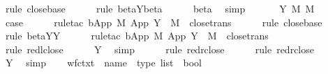 \begin{isabellebody}
\ {\isacharparenleft}rule\ close{\isachardot}base{\isacharparenright}\isanewline
\ \ \ \ \isamarkupfalse%
\ {\isacharparenleft}rule\ beta{\isacharunderscore}Y{\isachardot}beta{\isacharparenright}\isanewline
\ \ \ \ \isamarkupfalse%
\ beta\ \isamarkupfalse%
\ simp\isanewline
\ \ \isamarkupfalse%
\isanewline
\ \ \isamarkupfalse%
\ {\isacharparenleft}Y\ M\ M{\isacharprime}\ {\isasymsigma}{\isacharparenright}\ \isanewline
\ \ \ \ \isamarkupfalse%
\ {\isacharquery}case\isanewline
\ \ \ \ \isamarkupfalse%
\ {\isacharparenleft}rule{\isacharunderscore}tac\ b{\isacharequal}{\isachardoublequoteopen}App\ M\ {\isacharparenleft}App\ {\isacharparenleft}Y\ {\isasymsigma}{\isacharparenright}\ M{\isacharparenright}{\isachardoublequoteclose}\ \ close{\isachardot}trans{\isacharparenright}\isanewline
\ \ \ \ \isamarkupfalse%
\ {\isacharparenleft}rule\ close{\isachardot}base{\isacharparenright}\isanewline
\ \ \ \ \isamarkupfalse%
\ {\isacharparenleft}rule\ beta{\isacharunderscore}Y{\isachardot}Y{\isacharparenright}\isanewline
\ \ \ \ \isamarkupfalse%
\ {\isacharparenleft}rule{\isacharunderscore}tac\ b{\isacharequal}{\isachardoublequoteopen}App\ M{\isacharprime}\ {\isacharparenleft}App\ {\isacharparenleft}Y\ {\isasymsigma}{\isacharparenright}\ M{\isacharparenright}{\isachardoublequoteclose}\ \ close{\isachardot}trans{\isacharparenright}\isanewline
\ \ \ \ \isamarkupfalse%
\ {\isacharparenleft}rule\ red{\isacharunderscore}l{\isacharunderscore}close{\isacharparenright}\isanewline
\ \ \ \ \isamarkupfalse%
\ Y\ \isamarkupfalse%
\ simp\isanewline
\ \ \ \ \isamarkupfalse%
\ {\isacharparenleft}rule\ red{\isacharunderscore}r{\isacharunderscore}close{\isacharparenright}\isanewline
\ \ \ \ \isamarkupfalse%
\ {\isacharparenleft}rule\ red{\isacharunderscore}r{\isacharunderscore}close{\isacharparenright}\isanewline
\ \ \ \ \isamarkupfalse%
\ Y\ \isamarkupfalse%
\ simp\isanewline
\ \ \isamarkupfalse%
\isanewline
{}\isamarkupfalse%
%
\endisatagproof
{\isafoldproof}%
%
\isadelimproof
%
\endisadelimproof
%
\isamarkuptrue%
\isamarkupfalse%
\ wf{\isacharunderscore}ctxt\ {\isacharcolon}{\isacharcolon}\ {\isachardoublequoteopen}{\isacharparenleft}name\ {\isasymtimes}\ type{\isacharparenright}\ list\ {\isasymRightarrow}\ bool{\isachardoublequoteclose}\isanewline

\end{isabellebody}
